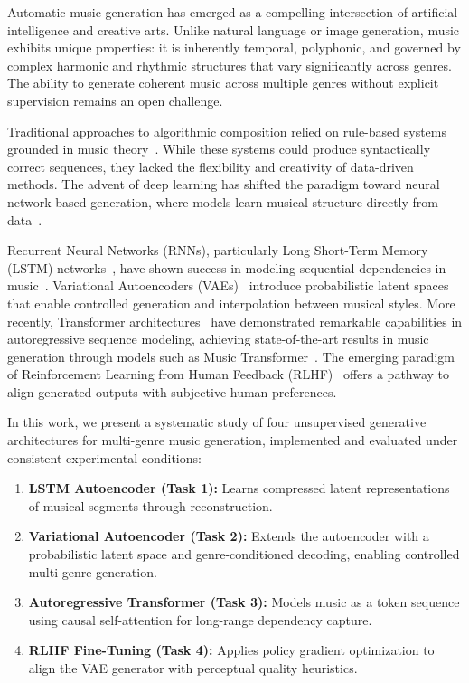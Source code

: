 \documentclass[conference]{IEEEtran}
\begin{document}
Automatic music generation has emerged as a compelling intersection of artificial intelligence and creative arts. Unlike natural language or image generation, music exhibits unique properties: it is inherently temporal, polyphonic, and governed by complex harmonic and rhythmic structures that vary significantly across genres. The ability to generate coherent music across multiple genres without explicit supervision remains an open challenge.

Traditional approaches to algorithmic composition relied on rule-based systems grounded in music theory~\cite{cope1996experiments}. While these systems could produce syntactically correct sequences, they lacked the flexibility and creativity of data-driven methods. The advent of deep learning has shifted the paradigm toward neural network-based generation, where models learn musical structure directly from data~\cite{briot2020deep}.

Recurrent Neural Networks (RNNs), particularly Long Short-Term Memory (LSTM) networks~\cite{hochreiter1997long}, have shown success in modeling sequential dependencies in music~\cite{eck2002first}. Variational Autoencoders (VAEs)~\cite{kingma2014auto} introduce probabilistic latent spaces that enable controlled generation and interpolation between musical styles. More recently, Transformer architectures~\cite{vaswani2017attention} have demonstrated remarkable capabilities in autoregressive sequence modeling, achieving state-of-the-art results in music generation through models such as Music Transformer~\cite{huang2019music}. The emerging paradigm of Reinforcement Learning from Human Feedback (RLHF)~\cite{christiano2017deep} offers a pathway to align generated outputs with subjective human preferences.

In this work, we present a systematic study of four unsupervised generative architectures for multi-genre music generation, implemented and evaluated under consistent experimental conditions:

\begin{enumerate}
    \item \textbf{LSTM Autoencoder (Task 1):} Learns compressed latent representations of musical segments through reconstruction.
    \item \textbf{Variational Autoencoder (Task 2):} Extends the autoencoder with a probabilistic latent space and genre-conditioned decoding, enabling controlled multi-genre generation.
    \item \textbf{Autoregressive Transformer (Task 3):} Models music as a token sequence using causal self-attention for long-range dependency capture.
    \item \textbf{RLHF Fine-Tuning (Task 4):} Applies policy gradient optimization to align the VAE generator with perceptual quality heuristics.
\end{enumerate}
\end{document}
